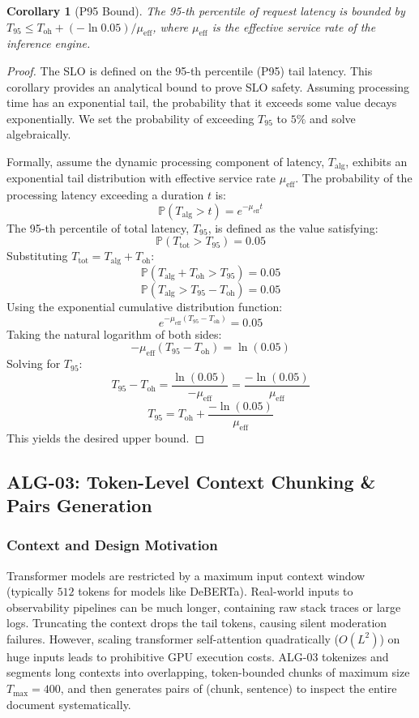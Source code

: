 \documentclass[11pt,a4paper]{article}
\theoremstyle{plain}
\newtheorem{corollary}[theorem]{Corollary}
\theoremstyle{definition}
\theoremstyle{remark}
\newcommand{\Prob}{\mathbb{P}}
\begin{document}
\begin{corollary}[P95 Bound]\label{cor:p95}
The 95-th percentile of request latency is bounded by $T_{95} \le T_{\mathrm{oh}} + (-\ln0.05)/\mu_{\mathrm{eff}}$, where $\mu_{\mathrm{eff}}$ is the effective service rate of the inference engine.
\end{corollary}
\begin{proof}
The SLO is defined on the 95-th percentile (P95) tail latency. This corollary provides an analytical bound to prove SLO safety. Assuming processing time has an exponential tail, the probability that it exceeds some value decays exponentially. We set the probability of exceeding $T_{95}$ to $5\%$ and solve algebraically.

Formally, assume the dynamic processing component of latency, $T_{\text{alg}}$, exhibits an exponential tail distribution with effective service rate $\mu_{\mathrm{eff}}$. The probability of the processing latency exceeding a duration $t$ is:
$$\Prob(T_{\text{alg}} > t) = e^{-\mu_{\mathrm{eff}} t}$$
The 95-th percentile of total latency, $T_{95}$, is defined as the value satisfying:
$$\Prob(T_{\mathrm{tot}} > T_{95}) = 0.05$$
Substituting $T_{\mathrm{tot}} = T_{\text{alg}} + T_{\mathrm{oh}}$:
$$\Prob(T_{\text{alg}} + T_{\mathrm{oh}} > T_{95}) = 0.05$$
$$\Prob(T_{\text{alg}} > T_{95} - T_{\mathrm{oh}}) = 0.05$$
Using the exponential cumulative distribution function:
$$e^{-\mu_{\mathrm{eff}}(T_{95} - T_{\mathrm{oh}})} = 0.05$$
Taking the natural logarithm of both sides:
$$-\mu_{\mathrm{eff}}(T_{95} - T_{\mathrm{oh}}) = \ln(0.05)$$
Solving for $T_{95}$:
$$T_{95} - T_{\mathrm{oh}} = \frac{\ln(0.05)}{-\mu_{\mathrm{eff}}} = \frac{-\ln(0.05)}{\mu_{\mathrm{eff}}}$$
$$T_{95} = T_{\mathrm{oh}} + \frac{-\ln(0.05)}{\mu_{\mathrm{eff}}}$$
This yields the desired upper bound.
\end{proof}

\subsection{ALG-03: Token-Level Context Chunking \& Pairs Generation}
\label{subsec:alg03}

\subsubsection{Context and Design Motivation}
Transformer models are restricted by a maximum input context window (typically $512$ tokens for models like DeBERTa). Real-world inputs to observability pipelines can be much longer, containing raw stack traces or large logs. Truncating the context drops the tail tokens, causing silent moderation failures. However, scaling transformer self-attention quadratically ($O(L^2)$) on huge inputs leads to prohibitive GPU execution costs.
ALG-03 tokenizes and segments long contexts into overlapping, token-bounded chunks of maximum size $T_{\max}=400$, and then generates pairs of (chunk, sentence) to inspect the entire document systematically.
\end{document}
